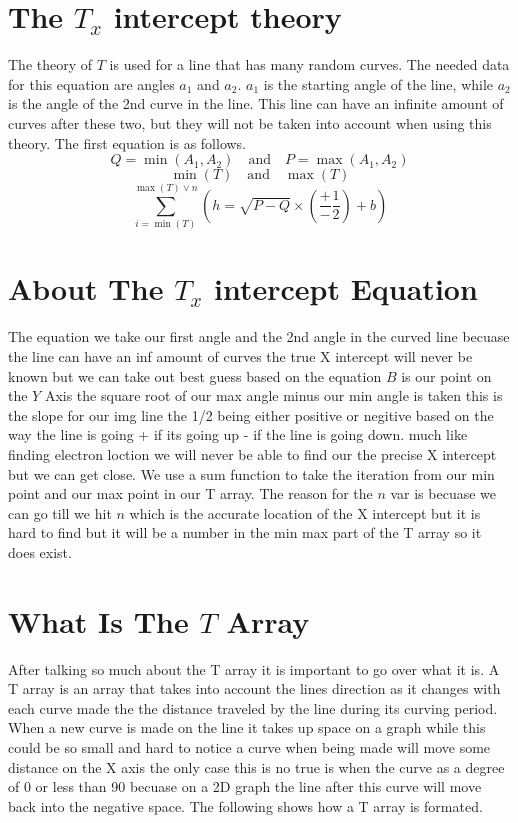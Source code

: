 \documentclass{article}
\begin{document}
\section{The \(T_x\) intercept theory}
The theory of \(T\) is used for a line that has many random curves. The needed data for this equation are angles \(a_1\) and \(a_2\). \(a_1\) is the starting angle of the line, while \(a_2\) is the angle of the 2nd curve in the line. This line can have an infinite amount of curves after these two, but they will not be taken into account when using this theory. The first equation is as follows.
\[
Q = \min(A_1, A_2) \quad \text{and} \quad P = \max(A_1, A_2)
\]
\[
\min(T) \quad \text{and} \quad \max(T)
\]
\[
\sum_{i=\min(T)}^{\max(T) \vee n} \left( h = \sqrt{P - Q} \times \left( \frac{+}{-} \frac{1}{2} \right) + b \right)
\]

\section{About The \(T_x\) intercept Equation}
The equation we take our first angle and the 2nd angle in the curved line becuase the line can have an inf amount of curves the true X intercept will never be known but we can take out best guess based on the equation \(B\) is our point on the \(Y\) Axis the square root of our max angle minus our min angle is taken this is the slope for our img line the 1/2 being either positive or negitive based on the way the line is going + if its going up - if the line is going down. much like finding electron loction we will never be able to find our the precise X intercept but we can get close. We use a sum function to take the iteration from our min point and our max point in our T array. The reason for the \(n\) var is becuase we can go till we hit \(n\) which is the accurate location of the X intercept but it is hard to find but it will be a number in the min max part of the T array so it does exist. 
\section{What Is The \(T\) Array}

After talking so much about the T array it is important to go over what it is. A T array is an array that takes into account the lines direction as it changes with each curve made the the distance traveled by the line during its curving period. When a new curve is made on the line it takes up space on a graph while this could be so small and hard to notice a curve when being made will move some distance on the X axis the only case this is no true is when the curve as a degree of 0 or less than 90 becuase on a 2D graph the line after this curve will move back into the negative space. The following shows how a T array is formated.
\end{document}
